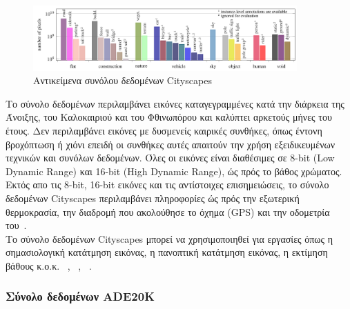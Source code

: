 \documentclass[12pt]{article}
\numberwithin{equation}{section}
\begin{document}
\begin{figure}[h!]
  \centering
  \includegraphics[width=0.9\textwidth]{images/cityscapes_objects.png} %
  \caption{Αντικείμενα συνόλου δεδομένων Cityscapes}
  \label{figure 7}
\end{figure}

Το σύνολο δεδομένων περιλαμβάνει εικόνες καταγεγραμμένες κατά την διάρκεια της Άνοιξης, του Καλοκαιριού και του Φθινωπόρου και καλύπτει αρκετούς μήνες του έτους. Δεν περιλαμβάνει εικόνες με δυσμενείς καιρικές συνθήκες, όπως έντονη βροχόπτωση ή χιόνι επειδή οι συνθήκες αυτές απαιτούν την χρήση εξειδικευμένων τεχνικών και συνόλων δεδομένων. Όλες οι εικόνες είναι διαθέσιμες σε 8-bit (Low Dynamic Range) και 16-bit (High Dynamic Range), ώς πρός το βάθος χρώματος. Εκτός απο τις 8-bit, 16-bit εικόνες και τις αντίστοιχες επισημειώσεις, το σύνολο δεδομένων Cityscapes περιλαμβάνει πληροφορίες ώς πρός την εξωτερική θερμοκρασία, την διαδρομή που ακολούθησε το όχημα (GPS) και την οδομετρία του~\cite{DBLP:journals/corr/CordtsORREBFRS16}. \\

Το σύνολο δεδομένων Cityscapes μπορεί να χρησιμοποιηθεί για εργασίες όπως η σημασιολογική κατάτμηση εικόνας, η πανοπτική κατάτμηση εικόνας, η εκτίμηση βάθους κ.ο.κ. ~\cite{DBLP:journals/corr/CordtsORREBFRS16}, ~\cite{cheng2022maskedattentionmasktransformeruniversal}, ~\cite{taghavi2024swinmtlsharedarchitecturesimultaneous}.




\subsubsection{Σύνολο δεδομένων ADE20K}
\end{document}
